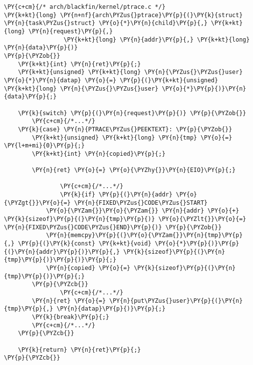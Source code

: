 \begin{Verbatim}[commandchars=\\\{\}]
\PY{c+cm}{/* arch/blackfin/kernel/ptrace.c */}
\PY{k+kt}{long} \PY{n+nf}{arch\PYZus{}ptrace}\PY{p}{(}\PY{k}{struct} \PY{n}{task\PYZus{}struct} \PY{o}{*}\PY{n}{child}\PY{p}{,} \PY{k+kt}{long} \PY{n}{request}\PY{p}{,}
                 \PY{k+kt}{long} \PY{n}{addr}\PY{p}{,} \PY{k+kt}{long} \PY{n}{data}\PY{p}{)}
\PY{p}{\PYZob{}}
	\PY{k+kt}{int} \PY{n}{ret}\PY{p}{;}
	\PY{k+kt}{unsigned} \PY{k+kt}{long} \PY{n}{\PYZus{}\PYZus{}user} \PY{o}{*}\PY{n}{datap} \PY{o}{=} \PY{p}{(}\PY{k+kt}{unsigned} \PY{k+kt}{long} \PY{n}{\PYZus{}\PYZus{}user} \PY{o}{*}\PY{p}{)}\PY{n}{data}\PY{p}{;}

	\PY{k}{switch} \PY{p}{(}\PY{n}{request}\PY{p}{)} \PY{p}{\PYZob{}}
        \PY{c+cm}{/*...*/}
	\PY{k}{case} \PY{n}{PTRACE\PYZus{}PEEKTEXT}: \PY{p}{\PYZob{}}
		\PY{k+kt}{unsigned} \PY{k+kt}{long} \PY{n}{tmp} \PY{o}{=} \PY{l+m+mi}{0}\PY{p}{;}
		\PY{k+kt}{int} \PY{n}{copied}\PY{p}{;}

		\PY{n}{ret} \PY{o}{=} \PY{o}{\PYZhy{}}\PY{n}{EIO}\PY{p}{;}

                \PY{c+cm}{/*...*/}
                \PY{k}{if} \PY{p}{(}\PY{n}{addr} \PY{o}{\PYZgt{}}\PY{o}{=} \PY{n}{FIXED\PYZus{}CODE\PYZus{}START}
		    \PY{o}{\PYZam{}}\PY{o}{\PYZam{}} \PY{n}{addr} \PY{o}{+} \PY{k}{sizeof}\PY{p}{(}\PY{n}{tmp}\PY{p}{)} \PY{o}{\PYZlt{}}\PY{o}{=} \PY{n}{FIXED\PYZus{}CODE\PYZus{}END}\PY{p}{)} \PY{p}{\PYZob{}}
			\PY{n}{memcpy}\PY{p}{(}\PY{o}{\PYZam{}}\PY{n}{tmp}\PY{p}{,} \PY{p}{(}\PY{k}{const} \PY{k+kt}{void} \PY{o}{*}\PY{p}{)}\PY{p}{(}\PY{n}{addr}\PY{p}{)}\PY{p}{,} \PY{k}{sizeof}\PY{p}{(}\PY{n}{tmp}\PY{p}{)}\PY{p}{)}\PY{p}{;}
			\PY{n}{copied} \PY{o}{=} \PY{k}{sizeof}\PY{p}{(}\PY{n}{tmp}\PY{p}{)}\PY{p}{;}
		\PY{p}{\PYZcb{}}
                \PY{c+cm}{/*...*/}
		\PY{n}{ret} \PY{o}{=} \PY{n}{put\PYZus{}user}\PY{p}{(}\PY{n}{tmp}\PY{p}{,} \PY{n}{datap}\PY{p}{)}\PY{p}{;}
		\PY{k}{break}\PY{p}{;}
        \PY{c+cm}{/*...*/}
	\PY{p}{\PYZcb{}}

	\PY{k}{return} \PY{n}{ret}\PY{p}{;}
\PY{p}{\PYZcb{}}
\end{Verbatim}
